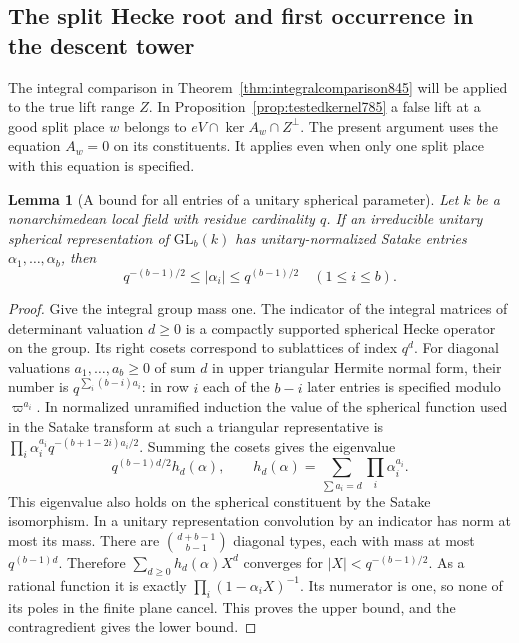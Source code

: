 \documentclass[a4paper,11pt]{article}
\newtheorem{lemma}[proposition]{Lemma}
\theoremstyle{definition}
\theoremstyle{remark}
\numberwithin{equation}{section}
\begin{document}
\subsection{The split Hecke root and first occurrence in the descent tower}
\label{sec:descenttower846}
The integral comparison in Theorem~\ref{thm:integralcomparison845}
will be applied to the true lift range \(Z\). In
Proposition~\ref{prop:testedkernel785} a false lift at a good split
place \(w\) belongs to \(eV\cap\ker A_w\cap Z^\perp\).
The present argument uses the equation \(A_w=0\) on its
constituents. It applies even when only one split place with this
equation is specified.

\begin{lemma}[A bound for all entries of a unitary spherical parameter]
\leavevmode\label{lem:unitarysatake846}
Let \(k\) be a nonarchimedean local field with residue cardinality
\(q\). If an irreducible unitary spherical representation of
\(\mathrm{GL}_b(k)\) has unitary-normalized Satake entries
\(\alpha_1,\ldots,\alpha_b\), then
\[
 q^{-(b-1)/2}\le|\alpha_i|\le q^{(b-1)/2}\quad(1\le i\le b).
\]
\end{lemma}
\begin{proof}
Give the integral group mass one. The indicator of the integral
matrices of determinant valuation \(d\ge0\) is a compactly
supported spherical Hecke operator on the group. Its right cosets
correspond to sublattices of index \(q^d\). For diagonal valuations
\(a_1,\ldots,a_b\ge0\) of sum \(d\) in upper triangular Hermite
normal form, their number is \(q^{\sum_i(b-i)a_i}\): in row \(i\)
each of the \(b-i\) later entries is specified modulo
\(\varpi^{a_i}\). In normalized unramified induction the value
of the spherical function used in the Satake transform at such
a triangular representative is
\(\prod_i\alpha_i^{a_i}q^{-(b+1-2i)a_i/2}\).
Summing the cosets gives the eigenvalue
\[
 q^{(b-1)d/2}h_d(\alpha),\qquad
 h_d(\alpha)=\sum_{\sum a_i=d}\prod_i\alpha_i^{a_i}.
\]
This eigenvalue also holds on the spherical constituent by the
Satake isomorphism. In a unitary representation convolution by
an indicator has norm at most its mass. There are
\(\binom{d+b-1}{b-1}\) diagonal types, each with mass at most
\(q^{(b-1)d}\). Therefore
\(\sum_{d\ge0}h_d(\alpha)X^d\) converges for
\(|X|<q^{-(b-1)/2}\). As a rational function it is exactly
\(\prod_i(1-\alpha_i X)^{-1}\). Its numerator is one, so none
of its poles in the finite plane cancel. This proves the upper
bound, and the contragredient gives the lower bound.
\end{proof}
\end{document}

